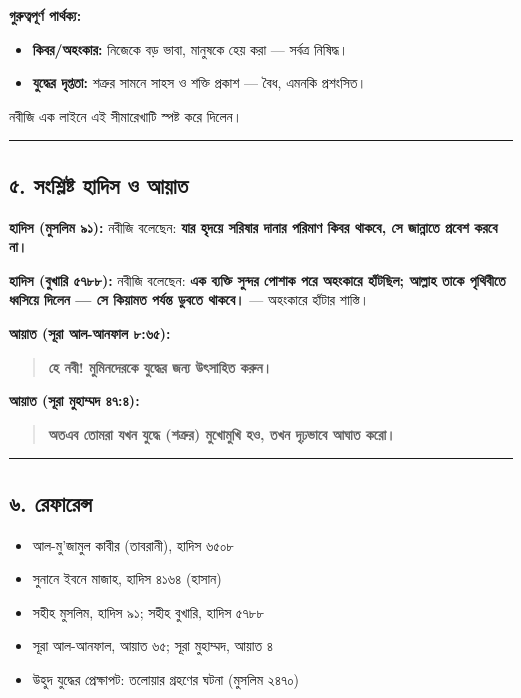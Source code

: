 \textbf{গুরুত্বপূর্ণ পার্থক্য:}
\begin{itemize}
\item \textbf{কিবর/অহংকার:} নিজেকে বড় ভাবা, মানুষকে হেয় করা — সর্বত্র নিষিদ্ধ।
\item \textbf{যুদ্ধের দৃপ্ততা:} শত্রুর সামনে সাহস ও শক্তি প্রকাশ — বৈধ, এমনকি প্রশংসিত।
\end{itemize}
নবীজি এক লাইনে এই সীমারেখাটি স্পষ্ট করে দিলেন।

\medskip\hrule\medskip

\subsection*{৫. সংশ্লিষ্ট হাদিস ও আয়াত}

\textbf{হাদিস (মুসলিম ৯১):} নবীজি বলেছেন: \textbf{যার হৃদয়ে সরিষার দানার পরিমাণ কিবর থাকবে, সে জান্নাতে প্রবেশ করবে না।}

\textbf{হাদিস (বুখারি ৫৭৮৮):} নবীজি বলেছেন: \textbf{এক ব্যক্তি সুন্দর পোশাক পরে অহংকারে হাঁটছিল; আল্লাহ তাকে পৃথিবীতে ধ্বসিয়ে দিলেন — সে কিয়ামত পর্যন্ত ডুবতে থাকবে।} — অহংকারে হাঁটার শাস্তি।

\textbf{আয়াত (সূরা আল-আনফাল ৮:৬৫):}
\begin{quote}
\textbf{হে নবী! মুমিনদেরকে যুদ্ধের জন্য উৎসাহিত করুন।}
\end{quote}

\textbf{আয়াত (সূরা মুহাম্মদ ৪৭:৪):}
\begin{quote}
\textbf{অতএব তোমরা যখন যুদ্ধে (শত্রুর) মুখোমুখি হও, তখন দৃঢ়ভাবে আঘাত করো।}
\end{quote}

\medskip\hrule\medskip

\subsection*{৬. রেফারেন্স}

\begin{itemize}
\item আল-মু'জামুল কাবীর (তাবরানী), হাদিস ৬৫০৮
\item সুনানে ইবনে মাজাহ, হাদিস ৪১৬৪ (হাসান)
\item সহীহ মুসলিম, হাদিস ৯১; সহীহ বুখারি, হাদিস ৫৭৮৮
\item সূরা আল-আনফাল, আয়াত ৬৫; সূরা মুহাম্মদ, আয়াত ৪
\item উহুদ যুদ্ধের প্রেক্ষাপট: তলোয়ার গ্রহণের ঘটনা (মুসলিম ২৪৭০)
\end{itemize}


